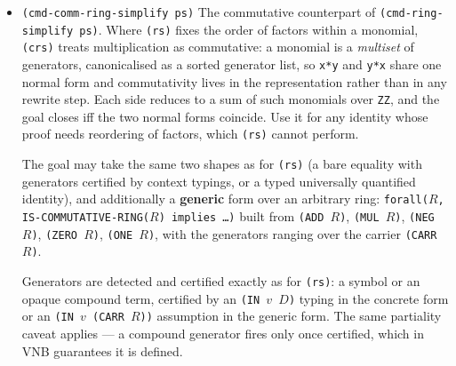 \begin{itemize}
  \begin{VNBcode}
;;; Directly on a universally quantified goal -- no (di) needed:
(sp (make-wff-from-string
  "forall([a in ZZ, b in ZZ, c in ZZ], a + b + c = c + b + a)"))
(rs)    ; closes in one step

;;; After (di), a compound term certified in context becomes a generator:
(sp (make-wff-from-string
  "forall([x in ZZ], (f(x) in ZZ) implies 3 + f(x) = 1 + f(x) + 2)"))
(di) (di) (rs)    ; di peels the forall then the hypothesis; rs then closes

;;; Coefficient arithmetic:
(sp (make-wff-from-string "forall([x in ZZ], 2*x + 3*x = 5*x)"))
(rs)
  \end{VNBcode}

  The primitive inference is \texttt{pi-ring-simplify!}, in
  \texttt{structure-library/ring-simplify.scm}; it normalizes each side to a
  canonical sum-of-monomials polynomial (\texttt{vnb->poly}) and compares.  The interactive short form is \texttt{(rs)}.

\item \texttt{(cmd-comm-ring-simplify ps)}
  The commutative counterpart of \texttt{(cmd-ring-simplify ps)}.  Where
  \texttt{(rs)} fixes the order of factors within a monomial,
  \texttt{(crs)} treats multiplication as commutative: a monomial is a
  \emph{multiset} of generators, canonicalised as a sorted generator
  list, so \texttt{x*y} and \texttt{y*x} share one normal form and
  commutativity lives in the representation rather than in any rewrite
  step.  Each side reduces to a sum of such monomials over \texttt{ZZ},
  and the goal closes iff the two normal forms coincide.  Use it for any
  identity whose proof needs reordering of factors, which \texttt{(rs)}
  cannot perform.

  The goal may take the same two shapes as for \texttt{(rs)} (a bare
  equality with generators certified by context typings, or a typed
  universally quantified identity), and additionally a \textbf{generic}
  form over an arbitrary ring: \texttt{forall($R$, IS-COMMUTATIVE-RING($R$)
  implies \ldots)} built from \texttt{(ADD $R$)}, \texttt{(MUL $R$)},
  \texttt{(NEG $R$)}, \texttt{(ZERO $R$)}, \texttt{(ONE $R$)}, with the
  generators ranging over the carrier \texttt{(CARR $R$)}.

  Generators are detected and certified exactly as for \texttt{(rs)}: a
  symbol or an opaque compound term, certified by an \texttt{(IN $v$ $D$)}
  typing in the concrete form or an \texttt{(IN $v$ (CARR $R$))} assumption in
  the generic form.  The same partiality caveat applies --- a compound
  generator fires only once certified, which in VNB guarantees it is
  defined.


\end{itemize}
